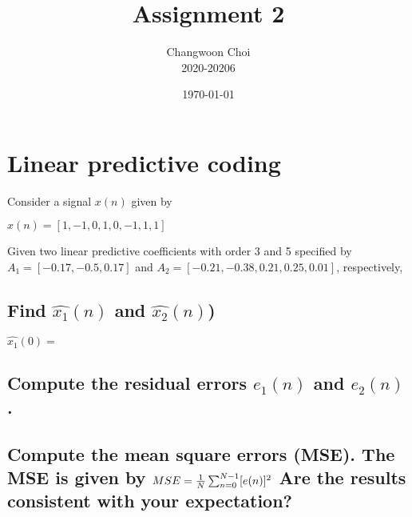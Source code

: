 \documentclass[12pt]{article}%
\begin{document}
\title{Assignment 2}
\author{Changwoon Choi \\ 2020-20206}
\date{\today}
\maketitle

\section{Linear predictive coding}
Consider a signal $x(n)$ given by \\
\begin{center}
	$x(n) = [1, -1, 0, 1, 0, -1, 1, 1]$
\end{center}
Given two linear predictive coefficients with order 3 and 5 specified by $A_1 = [-0.17, -0.5, 0.17]$ and $A_2 = [-0.21, -0.38, 0.21, 0.25, 0.01]$, respectively,
\subsection{Find $\hat{x_1}(n)$ and $\hat{x_2}(n)$)}
$\hat{x_1}(0) = $
\subsection{Compute the residual errors $e_1 (n)$ and $e_2 (n)$.}

\subsection{Compute the mean square errors (MSE). The MSE is given by $MSE = {1 \over N} \sum_{n=0}^{N-1}[e(n)]^2$ Are the results consistent with your expectation?}
\end{document}
